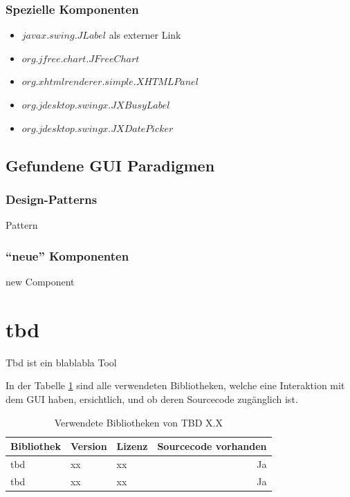   \subsubsection{Spezielle Komponenten}
    
  \begin{itemize}
    \item \(javax.swing.JLabel\) als externer Link
    \item \(org.jfree.chart.JFreeChart\)
    \item \(org.xhtmlrenderer.simple.XHTMLPanel\)
    \item \(org.jdesktop.swingx.JXBusyLabel\)
    \item \(org.jdesktop.swingx.JXDatePicker\)
  \end{itemize}
  
  \subsection{Gefundene GUI Paradigmen}
    
  \subsubsection{Design-Patterns}
  
  \begin{description}
    \item[Pattern]
  \end{description}
  
  \subsubsection{``neue'' Komponenten}
  
  \begin{description}
    \item[new Component]
  \end{description}
  
  \section{tbd}
  
  Tbd ist ein blablabla Tool
  
  In der Tabelle \ref{tab:bibliothekenTbd} sind alle verwendeten
  Bibliotheken, welche eine Interaktion mit dem \ac{GUI} haben, ersichtlich,
  und ob deren Sourcecode zugänglich ist.
  
  \begin{table}[ht]
    \begin{center}
      \begin{tabular}{lllr}
        \toprule
        Bibliothek & Version & Lizenz & Sourcecode vorhanden \\
        \midrule
        tbd & xx & xx & Ja\\
        tbd & xx & xx & Ja\\
        \bottomrule
      \end{tabular}
      \caption{Verwendete Bibliotheken von TBD X.X}
      \label{tab:bibliothekenTbd}
    \end{center}
  \end{table}
  
